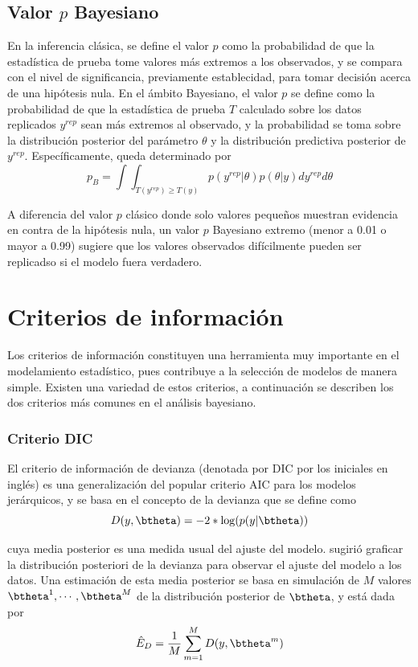 \documentclass[10pt,openright]{book}\usepackage[]{graphicx}\usepackage[]{color}
\begin{document}
\subsection{Valor $p$ Bayesiano}
En la inferencia clásica, se define el valor $p$ como la probabilidad de que la estadística de prueba tome valores más extremos a los observados, y se compara con el nivel de significancia, previamente establecidad, para tomar decisión acerca de una hipótesis nula. En el ámbito Bayesiano, el valor $p$ se define como la probabilidad de que la estadística de prueba $T$ calculado sobre los datos replicados $y^{rep}$ sean más extremos al observado, y la probabilidad se toma sobre la distribución posterior del parámetro $\theta$ y la distribución predictiva posterior de $y^{rep}$. Específicamente, queda determinado por
\begin{equation*}
p_B=\int\int_{{T(y^{rep})\geq T(y)}}p(y^{rep}|\theta)p(\theta|y)dy^{rep}d\theta
\end{equation*}

A diferencia del valor $p$ clásico donde solo valores pequeños muestran evidencia en contra de la hipótesis nula, un valor $p$ Bayesiano extremo (menor a 0.01 o mayor a 0.99) sugiere que los valores observados difícilmente pueden ser replicadso si el modelo fuera verdadero.
\section{Criterios de información}

Los criterios de información constituyen una herramienta muy importante en el modelamiento estadístico, pues contribuye a la selección de modelos de manera simple. Existen una variedad de estos criterios, a continuación se describen los dos criterios más comunes en el análisis bayesiano.

\subsubsection*{Criterio DIC}

El criterio de información de devianza (denotada por DIC por los iniciales en inglés) es una generalización del popular criterio AIC para los modelos jerárquicos, y se basa en el concepto de la devianza que se define como
\begin{equation}
D(y, \btheta)=-2*\log(p(y|\btheta))
\end{equation}

cuya media posterior es una medida usual del ajuste del modelo.  sugirió graficar la distribución posteriori de la devianza para observar el ajuste del modelo a los datos. Una estimación de esta media posterior se basa en simulación de $M$ valores $\btheta^1,\cdots,\btheta^M$ de la distribución posterior de $\btheta$, y está dada por
\begin{equation*}
\hat{E}_D=\frac{1}{M}\sum_{m=1}^MD(y,\btheta^m)
\end{equation*}
\end{document}
